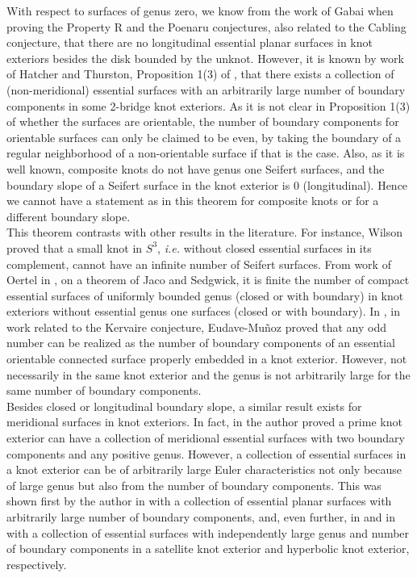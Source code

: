 \documentclass[reqno]{amsart}
\theoremstyle{definition}
\theoremstyle{remark}
\begin{document}
With respect to surfaces of genus zero, we know from the work of Gabai \cite{Gabai-87} when proving the Property R and the Poenaru conjectures,  also related to the Cabling conjecture,  that there are no longitudinal essential planar surfaces in knot exteriors besides the disk bounded by the unknot.  However,  it is known by work of Hatcher and Thurston, Proposition 1(3) of \cite{H-T-85}, that there exists a collection of (non-meridional) essential surfaces with an arbitrarily large number of boundary components in some 2-bridge knot exteriors. As it is not clear in Proposition 1(3) of \cite{H-T-85} whether the surfaces are orientable, the number of boundary components for orientable surfaces can only be claimed to be even, by taking the boundary of a regular neighborhood of a non-orientable surface if that is the case.  Also, as it is well known,  composite knots do not have genus one Seifert surfaces,  and the boundary slope of a Seifert surface in the knot exterior is 0 (longitudinal).  Hence we cannot have a statement as in this theorem for composite knots or for a different boundary slope.\\
This theorem contrasts with other results in the literature.  For instance,  Wilson \cite{W-08} proved that a small knot in $S^3$,  \textit{i.e.} without closed essential surfaces in its complement,  cannot have an infinite number of Seifert surfaces.   
From work of Oertel in \cite{Oertel-02},  on a theorem of Jaco and Sedgwick,  it is finite  the number of compact essential surfaces of uniformly bounded genus (closed or with  boundary) in knot exteriors without essential genus one surfaces (closed or with boundary).  In \cite{Eudave-13},  in work related to the Kervaire conjecture,  Eudave-Mu\~noz proved that any odd number can be realized as the number of boundary components of an essential orientable connected surface properly embedded in a knot exterior. However, not necessarily in the same knot exterior and the genus is not arbitrarily large for the same number of boundary components.\\ 
Besides closed or longitudinal boundary slope,  a similar result exists for meridional surfaces in knot exteriors.  In fact,  in \cite{N-15} the author proved a prime knot exterior can have a collection of meridional essential surfaces with two boundary components and any positive genus.  However,  a collection of essential  surfaces in a knot exterior can be of arbitrarily large Euler characteristics not only because of large genus but also from the number of boundary components.  This was shown first by the author in \cite{N-16} with a collection of essential planar surfaces with arbitrarily large number of boundary components,  and,  even further,  in \cite{N-18} and in \cite{N-21}  with a collection of essential surfaces with independently large genus and number of boundary components in a satellite knot exterior and hyperbolic knot exterior,  respectively. \\ 
\end{document}
